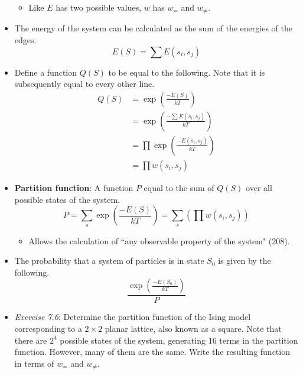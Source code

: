 \documentclass[titlepage]{article}
\numberwithin{figure}{section}
\numberwithin{table}{section}
\numberwithin{equation}{section}
\newcommand{\dq}[2]{``#1" (#2).}
\begin{document}
\begin{itemize}
\begin{itemize}
        \item Like $E$ has two possible values, $w$ has $w_=$ and $w_{\neq}$.
    \end{itemize}
    \item The energy of the system can be calculated as the sum of the energies of the edges.
    \begin{equation*}
        E(S) = \sum E(s_i,s_j)
    \end{equation*}
    \item Define a function $Q(S)$ to be equal to the following. Note that it is subsequently equal to every other line.
    \begin{align*}
        Q(S) &= \exp\left( \frac{-E(S)}{kT} \right)\\
        &= \exp\left( \frac{-\sum E(s_i,s_j)}{kT} \right)\\
        &= \prod \exp\left( \frac{-E(s_i,s_j)}{kT} \right)\\
        &= \prod w(s_i,s_j)
    \end{align*}
    \item \textbf{Partition function}: A function $P$ equal to the sum of $Q(S)$ over all possible states of the system.
    \begin{equation*}
        P = \sum_s\exp\left( \frac{-E(S)}{kT} \right) = \sum_s\left( \prod w(s_i,s_j) \right)
    \end{equation*}
    \begin{itemize}
        \item Allows the calculation of \dq{any observable property of the system}{208}
    \end{itemize}
    \item The probability that a system of particles is in state $S_0$ is given by the following.
    \begin{equation*}
        \frac{\exp\left( \frac{-E(S_0)}{kT} \right)}{P}
    \end{equation*}
    \item \emph{Exercise 7.6}: Determine the partition function of the Ising model corresponding to a $2\times 2$ planar lattice, also known as a square. Note that there are $2^4$ possible states of the system, generating 16 terms in the partition function. However, many of them are the same. Write the resulting function in terms of $w_=$ and $w_{\neq}$.
    \begin{figure}[h!]
        \centering
        \begin{subfigure}[b]{0.2\linewidth}
            \centering
\end{subfigure}
\end{figure}
\end{itemize}
\end{document}
